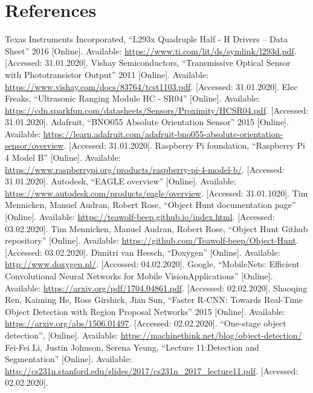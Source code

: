 \newpage

\section{References}
\begin{flushleft}
\begin{thebibliography}{99}
 Texas Instruments Incorporated, ``L293x Quadruple Half - H Drivers -- Data Sheet'' 2016 [Online]. Available: \url{https://www.ti.com/lit/ds/symlink/l293d.pdf}. [Accessed: 31.01.2020].
 Vishay Semiconductors, ``Transmissive Optical Sensor with Phototransistor Output'' 2011 [Online]. Available: \url{https://www.vishay.com/docs/83764/tcst1103.pdf}. [Accessed: 31.01.2020].
 Elec Freaks, ``Ultrasonic Ranging Module HC - SR04'' [Online]. Available: \url{https://cdn.sparkfun.com/datasheets/Sensors/Proximity/HCSR04.pdf}. [Accessed: 31.01.2020].
 Adafruit, ``BNO055 Absolute Orientation Sensor'' 2015 [Online]. Available: \url{https://learn.adafruit.com/adafruit-bno055-absolute-orientation-sensor/overview}. [Accessed: 31.01.2020].
 Raspberry Pi foundation, ``Raspberry Pi 4 Model B'' [Online]. Available: \url{https://www.raspberrypi.org/products/raspberry-pi-4-model-b/}. [Accessed: 31.01.2020].
 Autodesk, ``EAGLE overview'' [Online]. Available: \url{https://www.autodesk.com/products/eagle/overview}. [Accessed: 31.01.1020].
 Tim Mennicken, Manuel Audran, Robert Rose, ``Object Hunt documentation page'' [Online]. Available: \url{https://teawolf-beep.github.io/index.html}. [Accessed: 03.02.2020].
 Tim Mennicken, Manuel Audran, Robert Rose, ``Object Hunt Github repository'' [Online]. Available: \url{https://github.com/Teawolf-beep/Object-Hunt}. [Accessed: 03.02.2020].
 Dimitri van Heesch, ``Doxygen'' [Online]. Available: \url{http://www.doxygen.nl/}. [Accessed: 04.02.2020].
 Google, ``MobileNets: Efficient Convolutional Neural Networks for Mobile VisionApplications'' [Online]. Available: \url{https://arxiv.org/pdf/1704.04861.pdf}. [Accessed: 02.02.2020].
 Shaoqing Ren, Kaiming He, Ross Girshick, Jian Sun, ``Faster R-CNN: Towards Real-Time Object Detection with Region Proposal Networks'' 2015 [Online]. Available: \url{https://arxiv.org/abs/1506.01497}. [Accessed: 02.02.2020].
 ``One-stage object detection'', [Online]. Available: \url{https://machinethink.net/blog/object-detection/}
 Fei-Fei Li, Justin Johnson, Serena Yeung, ``Lecture 11:Detection and Segmentation'' [Online]. Available: \url{http://cs231n.stanford.edu/slides/2017/cs231n_2017_lecture11.pdf}. [Accessed: 02.02.2020].

\end{thebibliography}
\end{flushleft}
